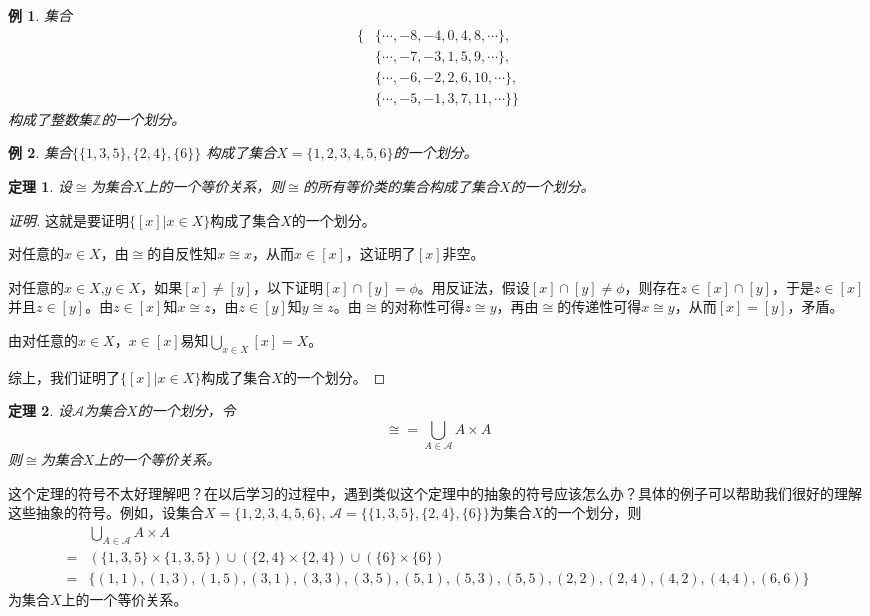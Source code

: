 \documentclass{article}
\newtheorem{Thm}{定理}
\newtheorem{Example}{例}
\begin{document}
\begin{CJK*}{UTF8}{gbsn}
  \begin{Example}
    集合
    \begin{equation*}
      \begin{split}
      \{&\{\cdots,-8,-4,0,4,8,\cdots\},\\
      &\{\cdots,-7,-3,1,5,9,\cdots\},\\
      &\{\cdots,-6,-2,2,6,10,\cdots\},\\
      &\{\cdots,-5,-1,3,7,11,\cdots\}\}
    \end{split}
  \end{equation*}
构成了整数集$\mathbb{Z}$的一个划分。
\end{Example}

  \begin{Example}
    集合$\{\{1,3,5\},\{2,4\},\{6\}\}$
构成了集合$X=\{1,2,3,4,5,6\}$的一个划分。
  \end{Example}

  \begin{Thm}\label{thm1}
    设$\cong$为集合$X$上的一个等价关系，则$\cong$的所有等价类的集合构成了集合$X$的一个划分。
  \end{Thm}
  \begin{proof}[证明]
    这就是要证明$\{[x]|x\in X\}$构成了集合$X$的一个划分。

    对任意的$x\in X$，由$\cong$的自反性知$x\cong x$，从而$x\in [x]$，这证明了$[x]$非空。

    对任意的$x\in X$,$y\in X$，如果$[x]\neq [y]$，以下证明$[x]\cap [y]=\phi$。用反证法，假设$[x]\cap [y]\neq \phi$，则存在$z\in [x]\cap [y]$，于是$z\in [x]$并且$z\in [y]$。由$z\in [x]$知$x\cong z$，由$z\in [y]$知$y\cong z$。由$\cong$的对称性可得$z\cong y$，再由$\cong$的传递性可得$x\cong y$，从而$[x]=[y]$，矛盾。

    由对任意的$x\in X$，$x\in [x]$易知$\bigcup_{x\in X}[x]=X$。

    综上，我们证明了$\{[x]|x\in X\}$构成了集合$X$的一个划分。
  \end{proof}
  \begin{Thm}\label{thm2}
    设$\mathscr{A}$为集合$X$的一个划分，令\[\cong = \bigcup_{A\in \mathscr{A}}A\times A\]
    则$\cong$为集合$X$上的一个等价关系。
  \end{Thm}
  这个定理的符号不太好理解吧？在以后学习的过程中，遇到类似这个定理中的抽象的符号应该怎么办？具体的例子可以帮助我们很好的理解这些抽象的符号。例如，设集合$X=\{1,2,3,4,5,6\}$, $\mathscr{A}=\{\{1,3,5\},\{2,4\},\{6\}\}$为集合$X$的一个划分，则
  \begin{equation*}
    \begin{split}
      &\bigcup_{A\in \mathscr{A}}A\times A\\
      =&(\{1,3,5\} \times \{1,3,5\}) \cup (\{2,4\}\times \{2,4\}) \cup (\{6\}\times \{6\})\\
      =&\{(1,1),(1,3),(1,5),(3,1),(3,3),(3,5),(5,1),(5,3),(5,5),(2,2),(2,4),(4,2),(4,4),(6,6)\}
    \end{split}
  \end{equation*}
  为集合$X$上的一个等价关系。


\end{CJK*}
\end{document}
